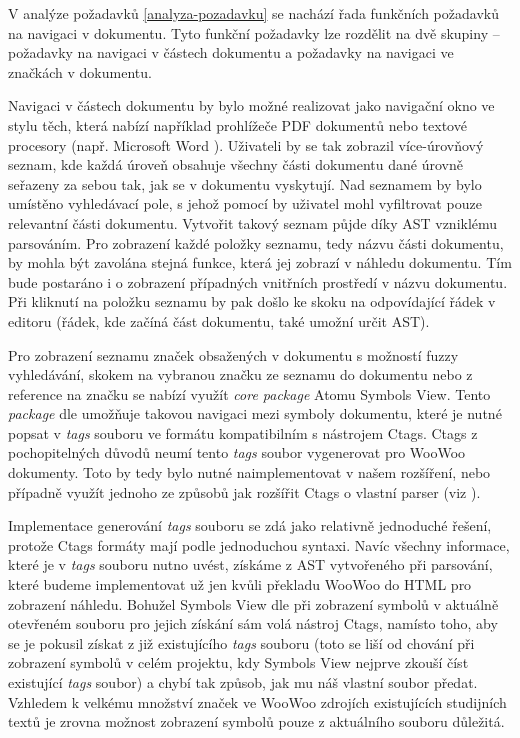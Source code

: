 V analýze požadavků \ref{analyza-pozadavku} se nachází řada funkčních požadavků na navigaci v dokumentu. Tyto funkční
požadavky lze rozdělit na dvě skupiny – požadavky na navigaci v částech dokumentu a požadavky na navigaci ve značkách v
dokumentu.

Navigaci v částech dokumentu by bylo možné realizovat jako navigační okno ve stylu těch, která nabízí například
prohlížeče PDF dokumentů nebo textové procesory (např. Microsoft Word \cite{word-docs}). Uživateli by se tak zobrazil
více-úrovňový seznam, kde každá úroveň obsahuje všechny části dokumentu dané úrovně seřazeny za sebou tak, jak se v
dokumentu vyskytují. Nad seznamem by bylo umístěno vyhledávací pole, s jehož pomocí by uživatel mohl vyfiltrovat pouze
relevantní části dokumentu. Vytvořit takový seznam půjde díky AST vzniklému parsováním. Pro zobrazení každé položky
seznamu, tedy názvu části dokumentu, by mohla být zavolána stejná funkce, která jej zobrazí v náhledu dokumentu. Tím
bude postaráno i o zobrazení případných vnitřních prostředí v názvu dokumentu. Při kliknutí na položku seznamu by pak
došlo ke skoku na odpovídající řádek v editoru (řádek, kde začíná část dokumentu, také umožní určit AST).

Pro zobrazení seznamu značek obsažených v dokumentu s možností fuzzy vyhledávání, skokem na vybranou značku ze seznamu
do dokumentu nebo z reference na značku se nabízí využít \textit{core package} Atomu Symbols View. Tento
\textit{package} dle \cite{atom-package-symbols-view} umožňuje takovou navigaci mezi symboly dokumentu, které je nutné
popsat v \textit{tags} souboru ve formátu kompatibilním s nástrojem Ctags. Ctags z pochopitelných důvodů neumí tento
\textit{tags} soubor vygenerovat pro WooWoo dokumenty. Toto by tedy bylo nutné naimplementovat v našem rozšíření, nebo
případně využít jednoho ze způsobů jak rozšířit Ctags o vlastní parser (viz \cite{ctags-docs}).

Implementace generování \textit{tags} souboru se zdá jako relativně jednoduché řešení, protože Ctags formáty mají
podle \cite{ctags-docs} jednoduchou syntaxi. Navíc všechny informace, které je v \textit{tags} souboru nutno uvést,
získáme z AST vytvořeného při parsování, které budeme implementovat už jen kvůli překladu WooWoo do HTML pro zobrazení
náhledu. Bohužel Symbols View dle \cite{atom-package-symbols-view-github} při zobrazení symbolů v aktuálně otevřeném
souboru pro jejich získání sám volá nástroj Ctags, namísto toho, aby se je pokusil získat z již existujícího
\textit{tags} souboru (toto se liší od chování při zobrazení symbolů v celém projektu, kdy Symbols View nejprve zkouší
číst existující \textit{tags} soubor) a chybí tak způsob, jak mu náš vlastní soubor předat. Vzhledem k velkému množství
značek ve WooWoo zdrojích existujících studijních textů je zrovna možnost zobrazení symbolů pouze z aktuálního souboru
důležitá.


